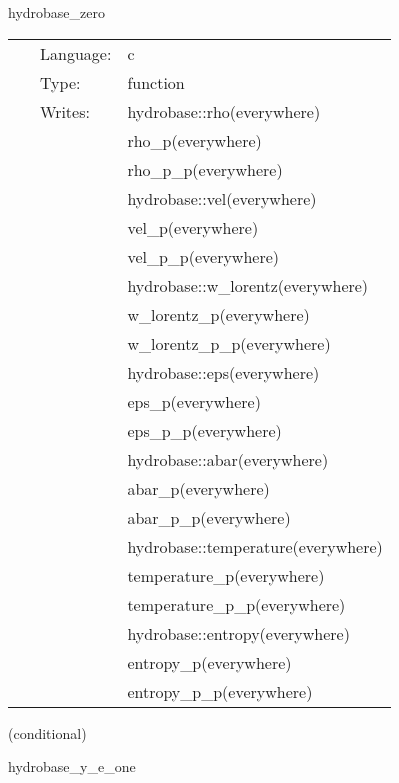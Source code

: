 \hspace{5mm} hydrobase\_zero 

\hspace{5mm}{\it set up vacuum hydro initial data } 


\hspace{5mm}

 \begin{tabular*}{160mm}{cll} 
~ & Language:  & c \\ 
~ & Type:  & function \\ 
~ & Writes:  & hydrobase::rho(everywhere) \\ 
~& ~ &rho\_p(everywhere)\\ 
~& ~ &rho\_p\_p(everywhere)\\ 
~& ~ &hydrobase::vel(everywhere)\\ 
~& ~ &vel\_p(everywhere)\\ 
~& ~ &vel\_p\_p(everywhere)\\ 
~& ~ &hydrobase::w\_lorentz(everywhere)\\ 
~& ~ &w\_lorentz\_p(everywhere)\\ 
~& ~ &w\_lorentz\_p\_p(everywhere)\\ 
~& ~ &hydrobase::eps(everywhere)\\ 
~& ~ &eps\_p(everywhere)\\ 
~& ~ &eps\_p\_p(everywhere)\\ 
~& ~ &hydrobase::abar(everywhere)\\ 
~& ~ &abar\_p(everywhere)\\ 
~& ~ &abar\_p\_p(everywhere)\\ 
~& ~ &hydrobase::temperature(everywhere)\\ 
~& ~ &temperature\_p(everywhere)\\ 
~& ~ &temperature\_p\_p(everywhere)\\ 
~& ~ &hydrobase::entropy(everywhere)\\ 
~& ~ &entropy\_p(everywhere)\\ 
~& ~ &entropy\_p\_p(everywhere)\\ 
\end{tabular*} 


\vspace{5mm}

   (conditional) 

\hspace{5mm} hydrobase\_y\_e\_one 

\hspace{5mm}{\it set electron fraction to 1 } 


